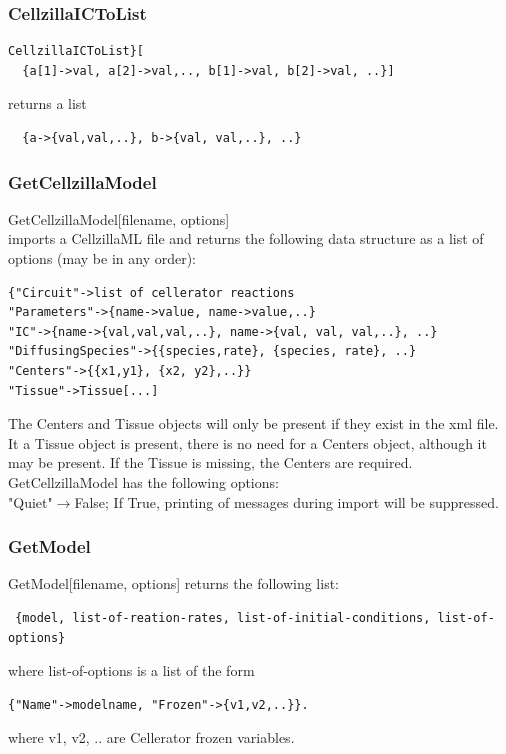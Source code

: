 \documentclass[12pt,letterpaper]{article}
\begin{document}
\subsubsection*{CellzillaICToList}
\begin{verbatim}
CellzillaICToList}[
  {a[1]->val, a[2]->val,.., b[1]->val, b[2]->val, ..}]
\end{verbatim}
returns a list
\begin{verbatim}
  {a->{val,val,..}, b->{val, val,..}, ..}
\end{verbatim}

\subsubsection*{GetCellzillaModel}
{\ttfamily GetCellzillaModel[filename, options]}\\

imports a CellzillaML file and returns the following data structure as a list of options (may be in any order):

\begin{verbatim}
{"Circuit"->list of cellerator reactions
"Parameters"->{name->value, name->value,..}
"IC"->{name->{val,val,val,..}, name->{val, val, val,..}, ..}
"DiffusingSpecies"->{{species,rate}, {species, rate}, ..}
"Centers"->{{x1,y1}, {x2, y2},..}}
"Tissue"->Tissue[...]
\end{verbatim}

The Centers and Tissue objects will only be present if they exist in the xml file. It a Tissue object is present, there is no need for a Centers object, although it may be present. If the Tissue is missing, the Centers are required.\\

{\ttfamily GetCellzillaModel} has the following options: \\

{\ttfamily "Quiet"$\to$False};  If {\ttfamily True}, printing of messages during import will be suppressed.

\subsubsection*{GetModel}

{\ttfamily GetModel[filename, options]} returns the following list:
\begin{verbatim}
 {model, list-of-reation-rates, list-of-initial-conditions, list-of-options}
\end{verbatim}
where {\ttfamily list-of-options} is a list of the form 
\begin{verbatim} 
{"Name"->modelname, "Frozen"->{v1,v2,..}}. 
\end{verbatim}
where v1, v2, .. are Cellerator frozen variables. \\
\end{document}
